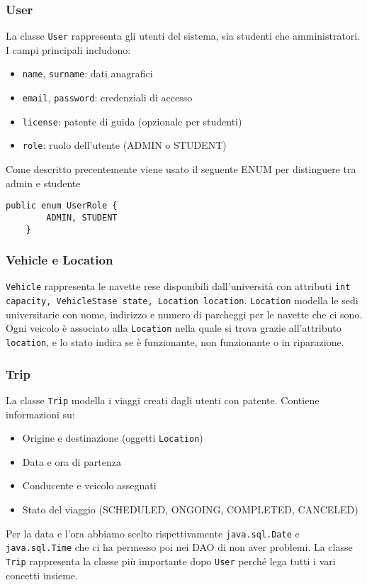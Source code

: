 \subsubsection{User}
La classe \texttt{User} rappresenta gli utenti del sistema, sia studenti che amministratori. I campi principali includono:
\begin{itemize}
\item \texttt{name}, \texttt{surname}: dati anagrafici
\item \texttt{email}, \texttt{password}: credenziali di accesso
\item \texttt{license}: patente di guida (opzionale per studenti)
\item \texttt{role}: ruolo dell'utente (ADMIN o STUDENT)
\end{itemize}
Come descritto precentemente viene usato il seguente ENUM per distinguere tra admin e studente
\begin{lstlisting}[style=java, caption={UserRole ENUM}]
public enum UserRole {
        ADMIN, STUDENT 
    }
\end{lstlisting}

\subsubsection{Vehicle e Location}
\texttt{Vehicle} rappresenta le navette rese disponibili dall'università con attributi \texttt{int capacity, VehicleStase state, Location location}. \texttt{Location} modella le sedi universitarie con nome, indirizzo e numero di parcheggi per le navette che ci sono.
Ogni veicolo è associato alla \texttt{Location} nella quale si trova grazie all'attributo \texttt{location}, e lo stato indica se è funzionante, non funzionante o in riparazione.
\subsubsection{Trip}
La classe \texttt{Trip} modella i viaggi creati dagli utenti con patente. Contiene informazioni su:
\begin{itemize}
\item Origine e destinazione (oggetti \texttt{Location})
\item Data e ora di partenza
\item Conducente e veicolo assegnati
\item Stato del viaggio (SCHEDULED, ONGOING, COMPLETED, CANCELED)
\end{itemize}
Per la data e l'ora abbiamo scelto rispettivamente \texttt{java.sql.Date} e \texttt{java.sql.Time} che ci ha permesso poi nei DAO di non aver problemi.
La classe \texttt{Trip} rappresenta la classe più importante dopo \texttt{User} perché lega tutti i vari concetti insieme.
